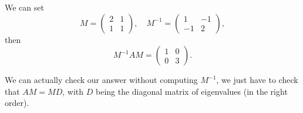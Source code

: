 \documentclass[10pt, a4paper]{article}
\begin{document}
\begin{example}
\begin{solution}
        We can set
        \[
        M = \begin{pmatrix}
            2 & 1 \\ 1 & 1
        \end{pmatrix},\quad
        M ^ {-1} =\begin{pmatrix}
            1 & -1 \\ -1 & 2
        \end{pmatrix},
        \]
        then
        \[
        M ^ {-1}AM = \begin{pmatrix}
            1 & 0 \\ 0 & 3
        \end{pmatrix}.
        \]
    \end{solution}
\end{example}

\begin{remark}
    We can actually check our answer without computing $M ^ {-1}$,
    we just have to check that $AM = MD$,
    with $D$ being the diagonal matrix of eigenvalues
    (in the right order).
\end{remark}
\end{document}
